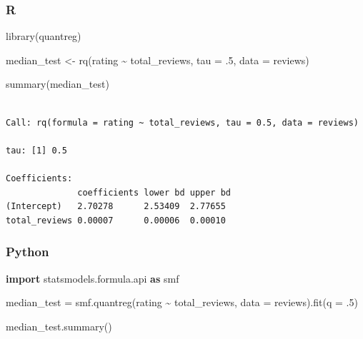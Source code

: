 \documentclass[
  letterpaper,
]{krantz}
\newenvironment{Shaded}{}{}
\newcommand{\AttributeTok}[1]{\textcolor[rgb]{0.49,0.56,0.16}{#1}}
\newcommand{\DecValTok}[1]{\textcolor[rgb]{0.25,0.63,0.44}{#1}}
\newcommand{\FloatTok}[1]{\textcolor[rgb]{0.25,0.63,0.44}{#1}}
\newcommand{\FunctionTok}[1]{\textcolor[rgb]{0.02,0.16,0.49}{#1}}
\newcommand{\ImportTok}[1]{\textcolor[rgb]{0.00,0.50,0.00}{\textbf{#1}}}
\newcommand{\NormalTok}[1]{#1}
\newcommand{\OperatorTok}[1]{\textcolor[rgb]{0.40,0.40,0.40}{#1}}
\newcommand{\OtherTok}[1]{\textcolor[rgb]{0.00,0.44,0.13}{#1}}
\newcommand{\SpecialCharTok}[1]{\textcolor[rgb]{0.25,0.44,0.63}{#1}}
\newcommand{\StringTok}[1]{\textcolor[rgb]{0.25,0.44,0.63}{#1}}
\begin{document}
\subsubsection{R}

\begin{Shaded}
\begin{Highlighting}[]
\FunctionTok{library}\NormalTok{(quantreg)}

\NormalTok{median\_test }\OtherTok{\textless{}{-}} \FunctionTok{rq}\NormalTok{(rating }\SpecialCharTok{\textasciitilde{}}\NormalTok{ total\_reviews, }\AttributeTok{tau =}\NormalTok{ .}\DecValTok{5}\NormalTok{, }
                \AttributeTok{data =}\NormalTok{ reviews)}

\FunctionTok{summary}\NormalTok{(median\_test)}
\end{Highlighting}
\end{Shaded}

\begin{verbatim}

Call: rq(formula = rating ~ total_reviews, tau = 0.5, data = reviews)

tau: [1] 0.5

Coefficients:
              coefficients lower bd upper bd
(Intercept)   2.70278      2.53409  2.77655 
total_reviews 0.00007      0.00006  0.00010 
\end{verbatim}

\subsubsection{Python}

\begin{Shaded}
\begin{Highlighting}[]
\ImportTok{import}\NormalTok{ statsmodels.formula.api }\ImportTok{as}\NormalTok{ smf}

\NormalTok{median\_test }\OperatorTok{=}\NormalTok{ smf.quantreg(}\StringTok{\textquotesingle{}rating \textasciitilde{} total\_reviews\textquotesingle{}}\NormalTok{, }
\NormalTok{                           data }\OperatorTok{=}\NormalTok{ reviews).fit(q }\OperatorTok{=} \FloatTok{.5}\NormalTok{)}
                           
\NormalTok{median\_test.summary()                           }
\end{Highlighting}
\end{Shaded}
\end{document}
